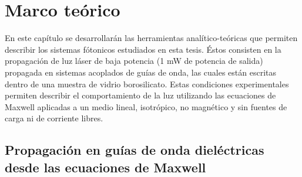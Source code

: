 \chapter{Marco teórico}

En este capítulo se desarrollarán las herramientas analítico-teóricas que permiten describir los sistemas fótonicos estudiados en esta tesis. Éstos consisten en la propagación de luz láser de baja potencia (1 mW de potencia de salida) propagada en sistemas acoplados de guías de onda, las cuales están escritas dentro de una muestra de vidrio borosilicato. Estas condiciones experimentales permiten describir el comportamiento de la luz utilizando las ecuaciones de Maxwell aplicadas a un medio lineal, isotrópico, no magnético y sin fuentes de carga ni de corriente libres. 

\section{Propagación en guías de onda dieléctricas desde las ecuaciones de Maxwell \label{cap:maxwell}}

